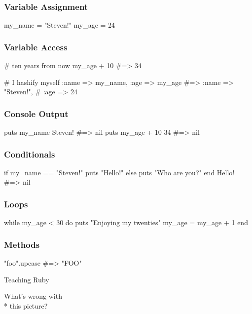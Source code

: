 \documentclass[20pt,aspectratio=169]{beamer}
\begin{document}
\begin{frame}[fragile]
\frametitle{Variable Assignment}
\begin{rubycode}
my_name = "Steven!"
my_age = 24
\end{rubycode}
\end{frame}

\begin{frame}[fragile]
\frametitle{Variable Access}
\begin{rubycode}
# ten years from now
my_age + 10 #=> 34

# I hashify myself
{ :name => my_name,
  :age => my_age }
#=> {:name => "Steven!",
#    :age => 24}
\end{rubycode}
\end{frame}

\begin{frame}[fragile]
\frametitle{Console Output}
\begin{rubycode}
puts my_name
Steven!
#=> nil
puts my_age + 10
34
#=> nil
\end{rubycode}
\end{frame}

\begin{frame}[fragile]
\frametitle{Conditionals}
\begin{rubycode}
if my_name == "Steven!"
  puts "Hello!"
else
  puts "Who are you?"
end
Hello!
#=> nil
\end{rubycode}
\end{frame}

\begin{frame}[fragile]
\frametitle{Loops}
\begin{rubycode}
while my_age < 30 do
  puts "Enjoying my twenties"
  my_age = my_age + 1
end
\end{rubycode}
\end{frame}

\begin{frame}[fragile]
\frametitle{Methods}
\begin{rubycode}
"foo".upcase #=> "FOO"
\end{rubycode}
\end{frame}

{
\begin{frame}
\par { Teaching Ruby}\par
\vspace{3cm}\hfill
{What's wrong with\\* \hfill this picture?}
\end{frame}
}
\end{document}
